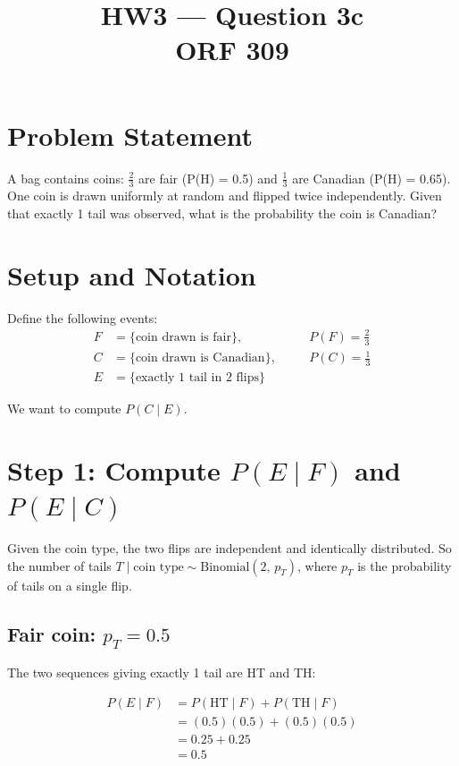 \documentclass[12pt]{article}
\title{HW3 --- Question 3c\\{\large ORF 309}}
\author{}
\date{}
\begin{document}
\maketitle

\section*{Problem Statement}

A bag contains coins: $\frac{2}{3}$ are fair (P(H) = 0.5) and $\frac{1}{3}$ are Canadian
(P(H) = 0.65). One coin is drawn uniformly at random and flipped twice independently.
Given that exactly 1 tail was observed, what is the probability the coin is Canadian?

\section*{Setup and Notation}

Define the following events:
\begin{align*}
F &= \{\text{coin drawn is fair}\}, \quad &&P(F) = \tfrac{2}{3} \\
C &= \{\text{coin drawn is Canadian}\}, \quad &&P(C) = \tfrac{1}{3} \\
E &= \{\text{exactly 1 tail in 2 flips}\}
\end{align*}

We want to compute $P(C \mid E)$.

\section*{Step 1: Compute $P(E \mid F)$ and $P(E \mid C)$}

Given the coin type, the two flips are independent and identically distributed.
So the number of tails $T \mid \text{coin type} \sim \mathrm{Binomial}(2,\, p_T)$,
where $p_T$ is the probability of tails on a single flip.

\subsection*{Fair coin: $p_T = 0.5$}

The two sequences giving exactly 1 tail are HT and TH:

\begin{align*}
P(E \mid F)
&= P(\text{HT} \mid F) + P(\text{TH} \mid F) \\
&= (0.5)(0.5) + (0.5)(0.5) \\
&= 0.25 + 0.25 \\
&= \boxed{0.5}
\end{align*}
\end{document}
